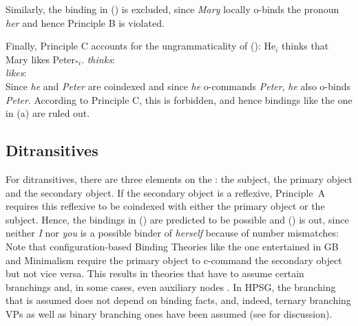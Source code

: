 \documentclass[output=paper,biblatex,babelshorthands,newtxmath,draftmode,colorlinks,citecolor=brown]{langscibook}
\begin{document}
Similarly, the binding in () is excluded, since \emph{Mary} locally o-binds the pronoun \emph{her}
and hence Principle B is violated.
\eal
{}
\zl

\noindent
Finally, Principle C accounts for the ungrammaticality of ():
\eal
\ex He$_i$ thinks that Mary likes Peter$_{*i}$.
\ex \emph{thinks}:\\
\argst {}
\ex \emph{likes}:\\
\argst {}
\zl
Since \emph{he} and \emph{Peter} are coindexed and since \emph{he} o-commands \emph{Peter},
\emph{he} also o-binds \emph{Peter}. According to Principle C, this is forbidden, and hence bindings
like the one in (a) are ruled out.

\largerpage
\subsection{Ditransitives}

For ditransitives, there are three elements on the \argstl: the subject, the primary object and the
secondary object. If the secondary object is a reflexive, Principle~A requires this reflexive to be
coindexed with either the primary object or the subject. Hence, the bindings in () are
predicted to be possible and () is out, since neither \emph{I} nor \emph{you} is a possible
binder of \emph{herself} because of number mismatches:
\eal
{}
\zl
{}
\z
Note that configuration-based Binding Theories like the one entertained in GB and Minimalism require
the primary object to c-command the secondary object but not vice versa. This results in theories
that have to assume certain branchings and, in some cases, even auxiliary nodes
\citep[Section~4.4]{Adger2003a}. In HPSG, the branching that is assumed does not depend on binding
facts, and, indeed, ternary branching VPs \citep[]{ps2} as well as binary branching ones have been assumed (see
 for discussion).
\end{document}
